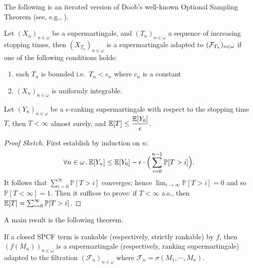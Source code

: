 The following is an iterated version of Doob's well-known Optional Sampling Theorem (see, e.g., \cite[\S 6.7]{AshDD00}).
\begin{theorem}
\label{thm:optional sampling}
Let $(X_n)_{n\in \omega}$ be a supermartingale, and $(T_n)_{n \in \omega}$ a sequence of increasing stopping times, then $(X_{T_n})_{n \in \omega}$ is a supermartingale adapted to $(\mathcal{F}_{T_n})_{n \in \omega}$ if one of the following conditions holds:
\begin{enumerate}
\item each $T_n$ is bounded i.e.~$T_n < c_n$ where $c_n$ is a constant
\item $(X_n)_{n\in \omega}$ is uniformly integrable.
\end{enumerate}
\end{theorem}

\begin{lemma}
\label{lem:rank-PAST}
Let $(Y_n)_{n \in \omega}$ be a $\epsilon$-ranking supermartingale with respect to the stopping time $T$, then $T < \infty$ almost surely, and $\mathbb{E}[T] \leq \dfrac{\mathbb{E}[Y_0]}{\epsilon}$.
\end{lemma}

\begin{proof}[Proof Sketch]
First establish by induction on $n$: 
\[
\forall n \in \omega \, . \, \mathbb{E}[Y_n] \leq \mathbb{E}[Y_0] - \epsilon \cdot \Big(\sum_{i=0}^{n-1} \mathbb{P}[T > i]\Big).
\]
It follows that $\sum_{i=0}^{\infty} \mathbb{P}[T > i]$ converges; hence $\lim_{i \to \infty} \mathbb{P}[T > i] = 0$ and so $\mathbb{P}[T < \infty] = 1$.
Then it suffices to prove: if $T < \infty$ a.s., then $\mathbb{E}[T] = \sum^\infty_{i=0} \mathbb{P}[T > i]$.
\end{proof}


\medskip

A main result is the following theorem.
\begin{theorem} 
\label{thm:rankable and strict rankable}
If a closed SPCF term is rankable (respectively, strictly rankable) by $f$, then $(f(M_n))_{n \in \omega}$ is a 
supermartingale (respectively, ranking supermartingale) adapted to the filtration $(\mathcal{F}_n)_{n \in \omega}$ where $\mathcal{F}_n = \sigma(M_1, \cdots, M_n)$.
\end{theorem}


